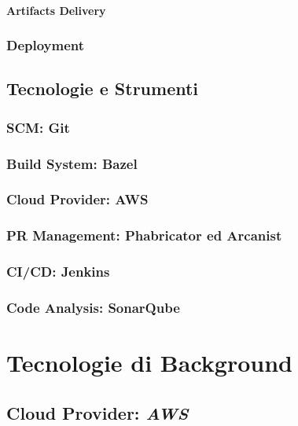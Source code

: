 \documentclass[a4paper,12pt]{report}
\begin{document}
	\subsubsection{Artifacts Delivery}
	
	\subsection{Deployment}
	
	\section{Tecnologie e Strumenti}
	
	\subsection{SCM: Git}
	
	\subsection{Build System: Bazel}
	
	\subsection{Cloud Provider: AWS}
	
	\subsection{PR Management: Phabricator ed Arcanist}
	
	\subsection{CI/CD: Jenkins}
	
	\subsection{Code Analysis: SonarQube}
	
	\chapter{Tecnologie di Background}
	
	\section{Cloud Provider: \emph{AWS}}
	
\end{document}
